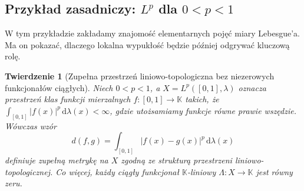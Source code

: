 \documentclass[11pt,a4paper]{article}
\numberwithin{equation}{section}
\theoremstyle{plain}
\newtheorem{twierdzenie}{Twierdzenie}[section]
\theoremstyle{definition}
\theoremstyle{remark}
\newcommand{\K}{\mathbb K}
\begin{document}
\subsection{Przykład zasadniczy: \texorpdfstring{$L^p$}{Lp} dla \texorpdfstring{$0<p<1$}{0 < p < 1}}

W tym przykładzie zakładamy znajomość elementarnych pojęć miary
Lebesgue'a. Ma on pokazać, dlaczego lokalna wypukłość będzie
później odgrywać kluczową rolę.

\begin{twierdzenie}[Zupełna przestrzeń liniowo-topologiczna
bez niezerowych funkcjonałów ciągłych]\label{thm:lp-trivial-dual}
Niech $0<p<1$, a $X=L^p([0,1],\lambda)$ oznacza przestrzeń
klas funkcji mierzalnych $f\colon[0,1]\to\K$ takich, że
$\int_{[0,1]}|f(x)|^p\,\mathrm d\lambda(x)<\infty$,
gdzie utożsamiamy funkcje równe prawie wszędzie.
Wówczas wzór
\[
 d(f,g)=\int_{[0,1]}|f(x)-g(x)|^p\,\mathrm d\lambda(x)
\]
definiuje zupełną metrykę na $X$ zgodną ze strukturą
przestrzeni liniowo-topologicznej. Co więcej, każdy
ciągły funkcjonał $\K$-liniowy $\Lambda\colon X\to\K$
jest równy zeru.
\end{twierdzenie}
\end{document}
